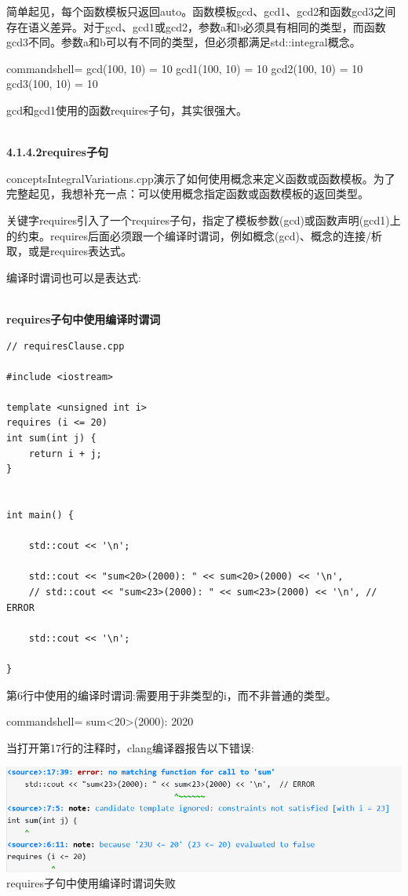 简单起见，每个函数模板只返回auto。函数模板gcd、gcd1、gcd2和函数gcd3之间存在语义差异。对于gcd、gcd1或gcd2，参数a和b必须具有相同的类型，而函数gcd3不同。参数a和b可以有不同的类型，但必须都满足std::integral概念。

\begin{tcblisting}{commandshell={}}
gcd(100, 10) = 10
gcd1(100, 10) = 10
gcd2(100, 10) = 10
gcd3(100, 10) = 10
\end{tcblisting}

gcd和gcd1使用的函数requires子句，其实很强大。

\hspace*{\fill} \\ %
\noindent
\textbf{4.1.4.2\hspace{0.2cm}requires子句}

conceptsIntegralVariations.cpp演示了如何使用概念来定义函数或函数模板。为了完整起见，我想补充一点：可以使用概念指定函数或函数模板的返回类型。

关键字requires引入了一个requires子句，指定了模板参数(gcd)或函数声明(gcd1)上的约束。requires后面必须跟一个编译时谓词，例如概念(gcd)、概念的连接/析取，或是requires表达式。

编译时谓词也可以是表达式:

\hspace*{\fill} \\ %
\noindent
\textbf{requires子句中使用编译时谓词}
\begin{lstlisting}[style=styleCXX]
// requiresClause.cpp

#include <iostream>

template <unsigned int i>
requires (i <= 20)
int sum(int j) {
	return i + j;
}


int main() {

	std::cout << '\n';

	std::cout << "sum<20>(2000): " << sum<20>(2000) << '\n',
	// std::cout << "sum<23>(2000): " << sum<23>(2000) << '\n', // ERROR

	std::cout << '\n';

}
\end{lstlisting}

第6行中使用的编译时谓词:需要用于非类型的i，而不非普通的类型。

\begin{tcblisting}{commandshell={}}
sum<20>(2000): 2020
\end{tcblisting}

当打开第17行的注释时，clang编译器报告以下错误:

\begin{center}
\includegraphics[width=1.0\textwidth]{content/3/chapter4/images/1-2.png}\\
requires子句中使用编译时谓词失败
\end{center}

